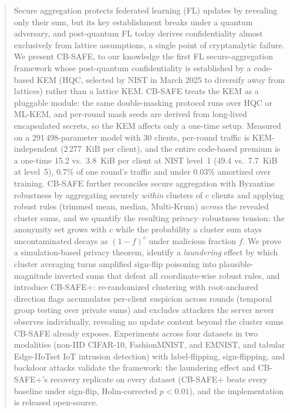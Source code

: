 \documentclass[lettersize,journal]{IEEEtran}
\begin{document}
\begin{abstract}
Secure aggregation protects federated learning (FL) updates by revealing only their
sum, but its key establishment breaks under a quantum adversary, and post-quantum FL
today derives confidentiality almost exclusively from lattice assumptions, a single
point of cryptanalytic failure. We present CB-SAFE, to our knowledge the first FL
secure-aggregation framework whose post-quantum confidentiality is established by a
code-based KEM (HQC, selected by NIST in March 2025 to diversify away from lattices)
rather than a lattice KEM. CB-SAFE treats the KEM as a pluggable module: the same
double-masking protocol runs over HQC or ML-KEM, and per-round mask seeds are derived
from long-lived encapsulated secrets, so the KEM affects only a one-time setup.
Measured on a 291\,498-parameter model with 30 clients, per-round traffic is
KEM-independent (2\,277~KiB per client), and the entire code-based premium is a
one-time 15.2 vs.\ 3.8~KiB per client at NIST level~1 (49.4 vs.\ 7.7~KiB at level~5),
$0.7\%$ of one round's traffic and under $0.03\%$ amortized over training. CB-SAFE further reconciles
secure aggregation with Byzantine robustness by aggregating securely \emph{within}
clusters of $c$ clients and applying robust rules (trimmed mean, median, Multi-Krum)
\emph{across} the revealed cluster sums, and we quantify the resulting
privacy--robustness tension: the anonymity set grows with $c$ while the probability a
cluster sum stays uncontaminated decays as $(1-f)^{c}$ under malicious fraction $f$.
We prove a simulation-based privacy theorem, identify a \emph{laundering} effect by
which cluster averaging turns amplified sign-flip poisoning into plausible-magnitude
inverted sums that defeat all coordinate-wise robust rules, and introduce CB-SAFE+:
re-randomized clustering with root-anchored direction flags accumulates per-client
suspicion across rounds (temporal group testing over private sums) and excludes
attackers the server never observes individually, revealing no update content beyond
the cluster sums CB-SAFE already exposes.
Experiments across four datasets in two modalities (non-IID CIFAR-10,
FashionMNIST, and EMNIST, and tabular Edge-IIoTset IoT intrusion detection) with
label-flipping, sign-flipping, and backdoor attacks validate the framework: the
laundering effect and CB-SAFE+'s recovery replicate on every dataset (CB-SAFE+
beats every baseline under sign-flip, Holm-corrected $p{<}0.01$), and the
implementation is released open-source.
\end{abstract}
\end{document}
